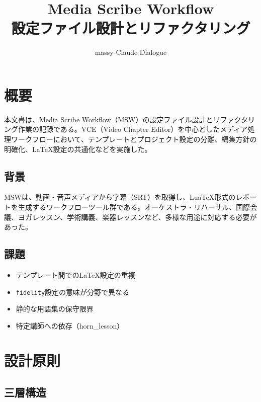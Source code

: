 \documentclass[a4paper,10pt,twocolumn]{ltjsarticle}
\title{\textbf{Media Scribe Workflow\\設定ファイル設計とリファクタリング}}
\author{massy-Claude Dialogue}
\date{}
\begin{document}
\maketitle
\thispagestyle{firstpage}

\tableofcontents

\section{概要}

本文書は、Media Scribe Workflow（MSW）の設定ファイル設計とリファクタリング作業の記録である。VCE（Video Chapter Editor）を中心としたメディア処理ワークフローにおいて、テンプレートとプロジェクト設定の分離、編集方針の明確化、LaTeX設定の共通化などを実施した。

\subsection{背景}

MSWは、動画・音声メディアから字幕（SRT）を取得し、LuaTeX形式のレポートを生成するワークフローツール群である。オーケストラ・リハーサル、国際会議、ヨガレッスン、学術講義、楽器レッスンなど、多様な用途に対応する必要があった。

\subsection{課題}

\begin{itemize}[noitemsep]
    \item テンプレート間でのLaTeX設定の重複
    \item \texttt{fidelity}設定の意味が分野で異なる
    \item 静的な用語集の保守限界
    \item 特定講師への依存（horn\_lesson）
\end{itemize}

\section{設計原則}

\subsection{三層構造}
\end{document}
